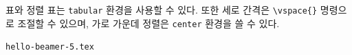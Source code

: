 \documentclass[compress]{beamer}
\begin{document}
\begin{frame}[fragile=singleslide]{표와 정렬}
  표는 \verb/tabular/ 환경을 사용할 수 있다.
  또한 세로 간격은 \verb/\vspace{}/ 명령으로 조절할 수 있으며, 가로 가운데
  정렬은 \verb/center/ 환경을 쓸 수 있다.
  \begin{block}{\texttt{hello-beamer-5.tex}}
    \begin{columns}
      \begin{column}{0.61\textwidth}
        \begin{latexcode}
        \end{latexcode}
      \end{column}
    \end{columns}
  \end{block}
\end{frame}
\end{document}
